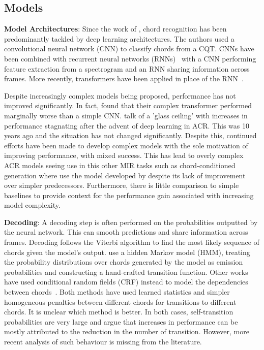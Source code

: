 \subsection{Models}

\textbf{Model Architectures}: Since the work of \citet{RethinkingChordRecognition}, chord recognition has been predominantly tackled by deep learning architectures. The authors used a convolutional neural network (CNN) to classify chords from a CQT. CNNs have been combined with recurrent neural networks (RNNs)~\citep{ACRCNNRNN1,ACRLargeVocab1,StructuredTraining} with a CNN performing feature extraction from a spectrogram and an RNN sharing information across frames. More recently, transformers have been applied in place of the RNN~\citep{MelodyTranscriptionViaGenerativePreTraining, HarmonyTransformer, AttendToChords,ChordFormer,CurriculumLearning,BTC}.

Despite increasingly complex models being proposed, performance has not improved significantly. In fact, \citet{BTC} found that their complex transformer performed marginally worse than a simple CNN. \citet{FourTimelyInsights} talk of a 'glass ceiling' with increases in performance stagnating after the advent of deep learning in ACR. This was 10 years ago and the situation has not changed significantly. Despite this, continued efforts have been made to develop complex models with the sole motivation of improving performance, with mixed success. This has lead to overly complex ACR models seeing use in this other MIR tasks such as chord-conditioned generation where \citet{MusiConGen} use the model developed by \citet{BTC} despite its lack of improvement over simpler predecessors. Furthermore, there is little comparison to simple baselines to provide context for the performance gain associated with increasing model complexity.

\textbf{Decoding}: A decoding step is often performed on the probabilities outputted by the neural network. This can smooth predictions and share information across frames. Decoding follows the Viterbi algorithm to find the most likely sequence of chords given the model's output. \citet{BalanceRandomForestACR} use a hidden Markov model (HMM), treating the probability distributions over chords generated by the model as emission probabilities and constructing a hand-crafted transition function.  Other works have used conditional random fields (CRF) instead to model the dependencies between chords~\citep{ACRLargeVocab1}. Both methods have used learned statistics and simpler homogeneous penalties between different chords for transitions to different chords. It is unclear which method is better. In both cases, self-transition probabilities are very large and \citet{CommonVariations} argue that increases in performance can be mostly attributed to the reduction in the number of transition. However, more recent analysis of such behaviour is missing from the literature.

